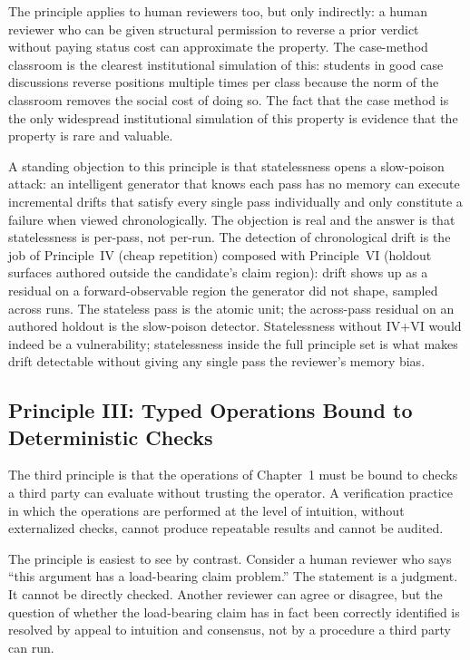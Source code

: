 \documentclass[11pt]{article}
\begin{document}
The principle applies to human reviewers too, but only indirectly: a human reviewer who can be given structural permission to reverse a prior verdict without paying status cost can approximate the property. The case-method classroom is the clearest institutional simulation of this: students in good case discussions reverse positions multiple times per class because the norm of the classroom removes the social cost of doing so. The fact that the case method is the only widespread institutional simulation of this property is evidence that the property is rare and valuable.

A standing objection to this principle is that statelessness opens a slow-poison attack: an intelligent generator that knows each pass has no memory can execute incremental drifts that satisfy every single pass individually and only constitute a failure when viewed chronologically. The objection is real and the answer is that statelessness is per-pass, not per-run. The detection of chronological drift is the job of Principle~IV (cheap repetition) composed with Principle~VI (holdout surfaces authored outside the candidate's claim region): drift shows up as a residual on a forward-observable region the generator did not shape, sampled across runs. The stateless pass is the atomic unit; the across-pass residual on an authored holdout is the slow-poison detector. Statelessness without IV+VI would indeed be a vulnerability; statelessness inside the full principle set is what makes drift detectable without giving any single pass the reviewer's memory bias.

\subsection{Principle III: Typed Operations Bound to Deterministic Checks}

The third principle is that the operations of Chapter~1 must be bound to checks a third party can evaluate without trusting the operator. A verification practice in which the operations are performed at the level of intuition, without externalized checks, cannot produce repeatable results and cannot be audited.

The principle is easiest to see by contrast. Consider a human reviewer who says ``this argument has a load-bearing claim problem.'' The statement is a judgment. It cannot be directly checked. Another reviewer can agree or disagree, but the question of whether the load-bearing claim has in fact been correctly identified is resolved by appeal to intuition and consensus, not by a procedure a third party can run.
\end{document}
